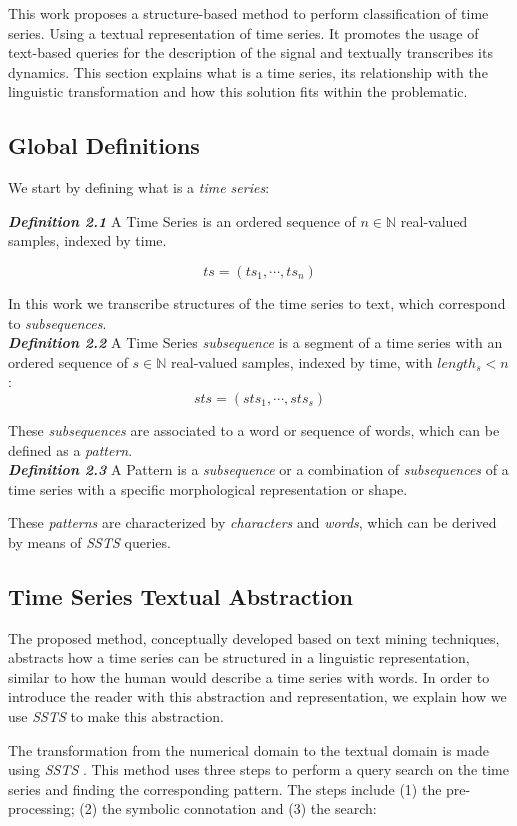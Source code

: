 This work proposes a structure-based method to perform classification of time series. Using a textual representation of time series. It promotes the usage of text-based queries for the description of the signal and textually transcribes its dynamics. This section explains what is a time series, its relationship with the linguistic transformation and how this solution fits within the problematic.

\subsection{Global Definitions}

We start by defining what is a \textit{time series}:


\textit{\textbf{Definition 2.1}} A Time Series is an ordered sequence of $n \in \mathbb{N}$ real-valued samples, indexed by time.

\[ts = (ts_1,\dotsb,ts_n)\]


In this work we transcribe structures of the time series to text, which correspond to \textit{subsequences}.\\

\textit{\textbf{Definition 2.2}} A Time Series \textit{subsequence} is a segment of a time series with an ordered sequence of $s \in \mathbb{N}$ real-valued samples, indexed by time, with $length_s < n$:
\[sts = (sts_1,\dotsb,sts_s)\]


These \textit{subsequences} are associated to a word or sequence of words, which can be defined as a \textit{pattern}.\\

\textit{\textbf{Definition 2.3}} A Pattern is a \textit{subsequence} or a combination of \textit{subsequences} of a time series with a specific morphological representation or shape.

 
 These \textit{patterns} are characterized by \textit{characters} and \textit{words}, which can be derived by means of \textit{SSTS} queries.
 
\subsection{Time Series Textual Abstraction}

The proposed method, conceptually developed based on text mining techniques, abstracts how a time series can be structured in a linguistic representation, similar to how the human would describe a time series with words. In order to introduce the reader with this abstraction and representation, we explain how we use \textit{SSTS} to make this abstraction.
\par
The transformation from the numerical domain to the textual domain is made using \textit{SSTS} \cite{ssts}. This method uses three steps to perform a query search on the time series and finding the corresponding pattern. The steps include (1) the pre-processing; (2) the symbolic connotation and (3) the search:

